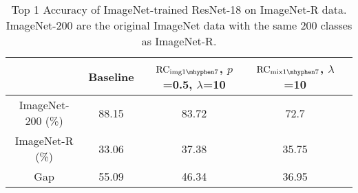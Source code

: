 \documentclass{article} \usepackage{iclr2021_conference,times}
\begin{document}
\begin{table}[htp]
	\small
\caption{Top 1 Accuracy of ImageNet-trained ResNet-18 on ImageNet-R data. ImageNet-200 are the original ImageNet data with the same 200 classes as ImageNet-R. }
	\label{table:imagenetR_resnet}
	\centering
	\begin{tabular}{c|cccc}
		\toprule
		      & Baseline &
		$\text{RC}_{\text{img}{1\mhyphen7}}$\tiny, $p$=0.5, $\lambda$=10   & $\text{RC}_{\text{mix}{1\mhyphen7}}$\tiny, $\lambda$=10   \\
		\toprule
		    ImageNet-200 (\%)    &  88.15         & 
		83.72 &  72.7 \\
		 ImageNet-R (\%) &  33.06   
		& 37.38 & 35.75 \\
		Gap & 55.09 & 46.34 & 36.95\\
		\bottomrule
	\end{tabular}
\end{table}
\end{document}
